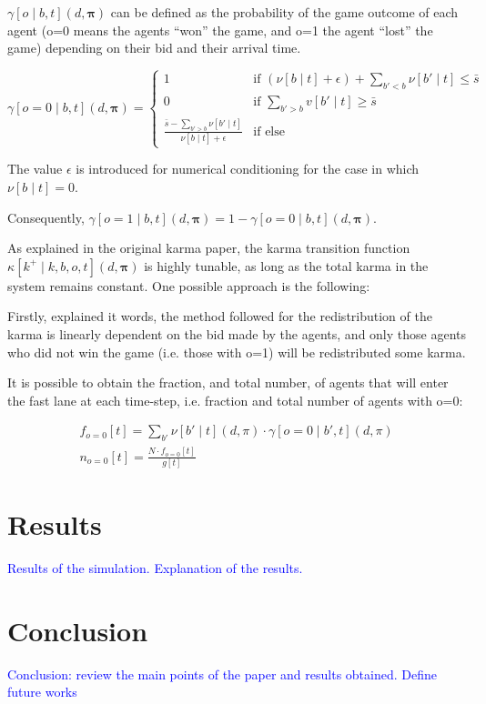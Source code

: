 \documentclass[a4paper,11pt,twoside]{book}
\begin{document}
$\gamma[o \mid b,t](d,\bm{\pi})$ can be defined as the probability of the game outcome of each agent (o=0 means the agents ``won'' the game, and o=1 the agent ``lost'' the game) depending on their bid and their arrival time. 

\begin{equation}
    \gamma[o = 0 \mid b,t](d,\bm{\pi}) = \begin{cases}
        1 & \text{if } (\nu[b \mid t] + \epsilon) + \sum_{b'<b} \nu[b' \mid t] \leq \bar{s} \\
        0 & \text{if } \sum_{b'>b} v[b' \mid t] \geq \bar{s} \\
        \frac{\bar{s} - \sum_{b'>b}\nu[b' \mid t]}{\nu[b \mid t] + \epsilon} & \text{if else}
    \end{cases}
\end{equation}

The value $\epsilon$ is introduced for numerical conditioning for the case in which $\nu[b \mid t] = 0$.

Consequently,  $\gamma[o = 1 \mid b,t](d,\bm{\pi}) = 1 - \gamma[o = 0 \mid b,t](d,\bm{\pi})$.

As explained in the original karma paper, the karma transition function $\kappa[k^+ \mid k,b,o,t](d,\bm{\pi})$ is highly tunable, as long as the total karma in the system remains constant. One possible approach is the following:

Firstly, explained it words, the method followed for the redistribution of the karma is linearly dependent on the bid made by the agents, and only those agents who did not win the game (i.e. those with o=1) will be redistributed some karma.

It is possible to obtain the fraction, and total number, of agents that will enter the fast lane at each time-step, i.e. fraction and total number of agents with o=0:

\begin{gather}
    f_{o=0}[t] = \sum_{b'} \nu [b' \mid t](d,\pi) \cdot \gamma [o=0 \mid b',t](d,\pi)\\ 
    n_{o=0}[t] = \frac{N \cdot f_{o=0}[t]}{g[t]} 
\end{gather}





\chapter{Results}

\textcolor{blue}{Results of the simulation. Explanation of the results.}


\chapter{Conclusion}

\textcolor{blue}{Conclusion: review the main points of the paper and results obtained. Define future works}



\cleardoublepage
\printbibliography
\end{document}
